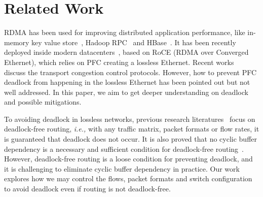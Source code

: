 \section{Related Work}

 RDMA has been used for improving distributed application performance,
like in-memory key value store~\cite{mitchell13atc, farm, kalia14sigcomm}, 
Hadoop RPC~\cite{hadooprdma} and HBase~\cite{hbaserdma}.
It has been recently deployed inside modern datacenters~\cite{timely,dcqcn,rdmascale}, based on
RoCE (RDMA over Converged Ethernet), which relies on PFC creating a lossless Ethernet.
Recent works~\cite{timely,dcqcn} discuss the transport congestion control protocols. However,
how to prevent PFC deadlock from happening in the lossless Ethernet has been pointed out 
but not well addressed. In this paper, we aim to get deeper understanding on deadlock 
and possible mitigations.

 To avoiding deadlock in lossless networks, previous research 
literatures~\cite{tcpbolt,karol2003prevention} focus on deadlock-free routing, 
{\em i.e.,} with any traffic matrix, packet formats or flow rates, it is guaranteed that deadlock 
does not occur. It is also proved that no cyclic buffer dependency is a necessary and
sufficient condition for deadlock-free routing~\cite{deadlockfree}. However, deadlock-free
routing is a loose condition for preventing deadlock, and it is challenging to eliminate 
cyclic buffer dependency in practice. Our work explores how we may control the flows,
packet formats and switch configuration to avoid deadlock even if routing is not deadlock-free.






